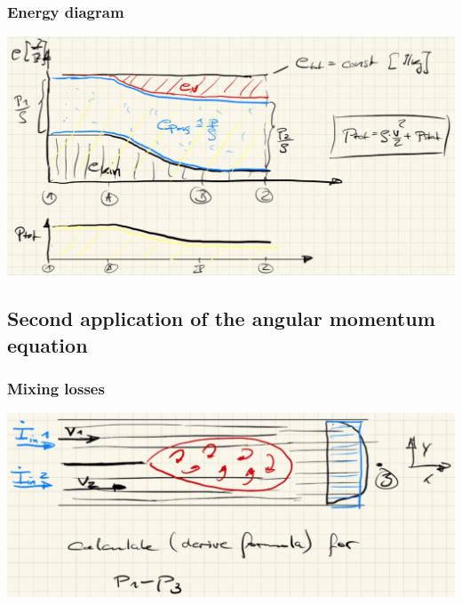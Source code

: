 \documentclass{article}
\begin{document}
\newpage
\subsubsection{Energy diagram}
\begin{center}
    \includegraphics[width=\textwidth]{media/energy_diagramm_angular.png}
\end{center}

\subsection{Second application of the angular momentum equation}
\subsubsection{Mixing losses}
\begin{center}
    \includegraphics[width=.75\textwidth]{media/mixing_losses.png}
\end{center}
\end{document}
